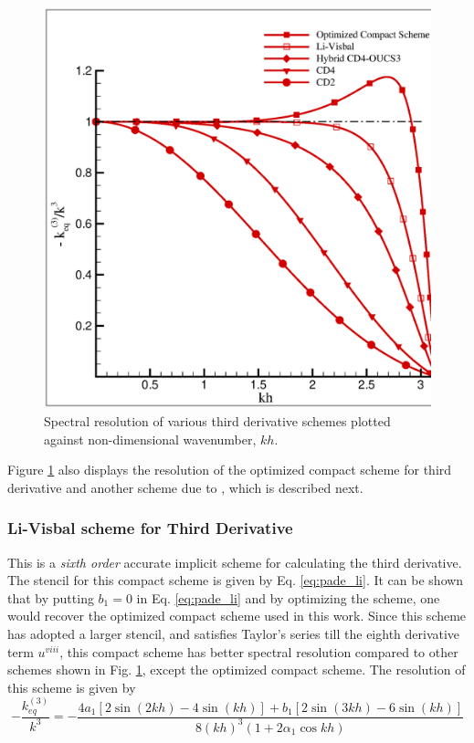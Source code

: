 \begin{figure}[h!]
\centerline{
\includegraphics[width=0.5\linewidth]{Fig_6}
}
\caption{Spectral resolution of various third derivative schemes plotted against non-dimensional wavenumber, $kh$.}
\label{fig:keq}
\end{figure}

Figure \ref{fig:keq} also displays the resolution of the optimized compact scheme for third derivative and another scheme due to \cite{Li2006}, which 
is described next.

\subsubsection{Li-Visbal scheme for Third Derivative}
This is a \emph{sixth order} accurate implicit scheme for calculating the third derivative. The stencil for this compact scheme is given by Eq. \eqref{eq:pade_li}. It can be shown that by putting $b_1=0$ in Eq. \eqref{eq:pade_li} and by optimizing the scheme, one would recover the optimized compact scheme used in this work. Since this scheme has adopted a larger stencil, and satisfies Taylor's series till the eighth derivative term $u^{viii}$, this compact scheme has better spectral resolution compared to other schemes shown in Fig. \ref{fig:keq}, except the optimized compact scheme. The resolution of this scheme is given by 
\begin{equation}
\label{eq:keq_li}
-\frac{k_{eq}^{(3)}}{k^{3}}=
      -\frac{4a_1\left[2\sin(2kh) - 4\sin (kh)\right] + b_1\left[2\sin(3kh)- 6\sin (kh) \right]}
           {8(kh)^3 (1+2\alpha_1\cos kh) }
\end{equation}

